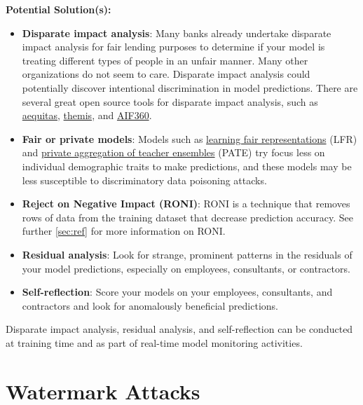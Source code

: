 \documentclass[fleqn]{article}
\begin{document}
\noindent\textbf{Potential Solution(s):} 
\begin{itemize}

\item \textbf{Disparate impact analysis}: Many banks already undertake disparate impact analysis for fair lending purposes to determine if your model is treating different types of people in an unfair manner. Many other organizations do not seem to care. Disparate impact analysis could potentially discover intentional discrimination in model predictions. There are several great open source tools for disparate impact analysis, such as \href{https://github.com/dssg/aequitas}{aequitas}, \href{https://github.com/LASER-UMASS/Themis}{themis}, and \href{http://aif360.mybluemix.net/}{AIF360}. 

\item \textbf{Fair or private models}: Models such as \href{https://www.cs.toronto.edu/~toni/Papers/icml-final.pdf}{learning fair representations} (LFR) and \href{https://arxiv.org/pdf/1802.08908.pdf}{private aggregation of teacher ensembles} (PATE) try focus less on individual demographic traits to make predictions, and these models may be less susceptible to discriminatory data poisoning attacks. 

\item \textbf{Reject on Negative Impact (RONI)}: RONI is a technique that removes rows of data from the training dataset that decrease prediction accuracy. See further \ref{sec:ref} for more information on RONI. 

\item \textbf{Residual analysis}: Look for strange, prominent patterns in the residuals of your model predictions, especially on employees, consultants, or contractors. 

\item \textbf{Self-reflection}: Score your models on your employees, consultants, and contractors and look for anomalously beneficial predictions. 

\end{itemize}

\noindent Disparate impact analysis, residual analysis, and self-reflection can be conducted at training time and as part of real-time model monitoring activities.

\section{Watermark Attacks}
\end{document}

